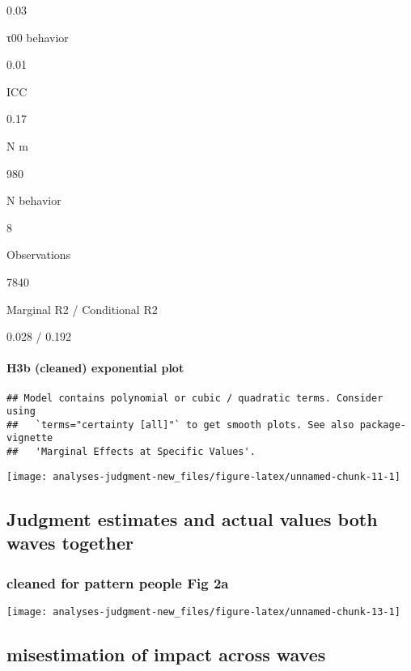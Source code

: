 \documentclass[
]{article}
\begin{document}
0.03

τ00 behavior

0.01

ICC

0.17

N m

980

N behavior

8

Observations

7840

Marginal R2 / Conditional R2

0.028 / 0.192

\hypertarget{h3b-cleaned-exponential-plot}{%
\paragraph{H3b (cleaned) exponential
plot}\label{h3b-cleaned-exponential-plot}}

\begin{verbatim}
## Model contains polynomial or cubic / quadratic terms. Consider using
##   `terms="certainty [all]"` to get smooth plots. See also package-vignette
##   'Marginal Effects at Specific Values'.
\end{verbatim}

\begin{center}\texttt{[image: analyses-judgment-new\_files/figure-latex/unnamed-chunk-11-1]} \end{center}

\hypertarget{judgment-estimates-and-actual-values-both-waves-together}{%
\subsection{Judgment estimates and actual values both waves
together}\label{judgment-estimates-and-actual-values-both-waves-together}}

\hypertarget{cleaned-for-pattern-people-fig-2a}{%
\subsubsection{cleaned for pattern people Fig
2a}\label{cleaned-for-pattern-people-fig-2a}}

\begin{center}\texttt{[image: analyses-judgment-new\_files/figure-latex/unnamed-chunk-13-1]} \end{center}

\hypertarget{misestimation-of-impact-across-waves}{%
\subsection{misestimation of impact across
waves}\label{misestimation-of-impact-across-waves}}
\end{document}
